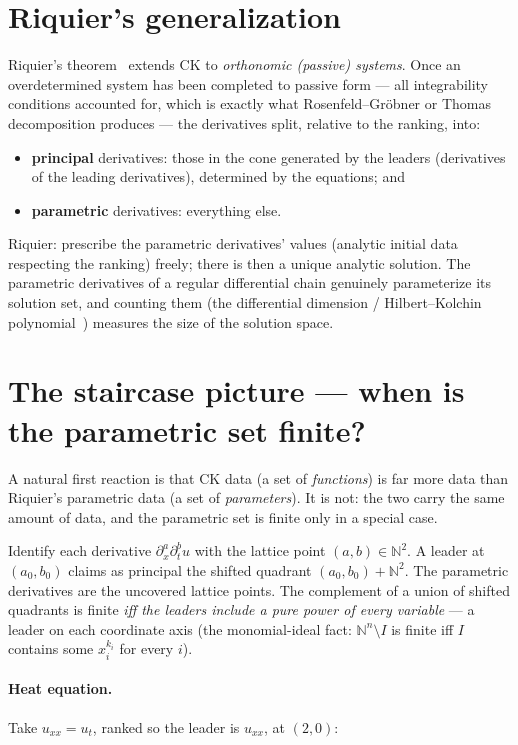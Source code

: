\documentclass[11pt]{article}
\begin{document}
\section{Riquier's generalization}

Riquier's theorem~\cite{riquier} extends CK to \emph{orthonomic (passive)
systems}.  Once an overdetermined system has been completed to passive
form --- all integrability conditions accounted for, which is exactly what
Rosenfeld--Gr\"obner or Thomas decomposition produces --- the derivatives
split, relative to the ranking, into:
\begin{itemize}
\item \textbf{principal} derivatives: those in the cone generated by the
  leaders (derivatives of the leading derivatives), determined by the
  equations; and
\item \textbf{parametric} derivatives: everything else.
\end{itemize}
Riquier: prescribe the parametric derivatives' values (analytic initial
data respecting the ranking) freely; there is then a unique analytic
solution.  The parametric derivatives of a regular differential chain
genuinely parameterize its solution set, and counting them (the
differential dimension / Hilbert--Kolchin polynomial~\cite{kolchin})
measures the size of the solution space.

\section{The staircase picture --- when is the parametric set finite?}

A natural first reaction is that CK data (a set of \emph{functions}) is
far more data than Riquier's parametric data (a set of
\emph{parameters}).  It is not: the two carry the same amount of data,
and the parametric set is finite only in a special case.

Identify each derivative $\partial_x^a\partial_t^b u$ with the lattice
point $(a,b)\in\mathbb{N}^2$.  A leader at $(a_0,b_0)$ claims as
principal the shifted quadrant $(a_0,b_0)+\mathbb{N}^2$.  The parametric
derivatives are the uncovered lattice points.  The complement of a union
of shifted quadrants is finite \emph{iff the leaders include a pure power
of every variable} --- a leader on each coordinate axis (the
monomial-ideal fact: $\mathbb{N}^n\setminus I$ is finite iff $I$ contains
some $x_i^{k_i}$ for every $i$).

\paragraph{Heat equation.}
Take $u_{xx}=u_t$, ranked so the leader is $u_{xx}$, at $(2,0)$:
\end{document}
